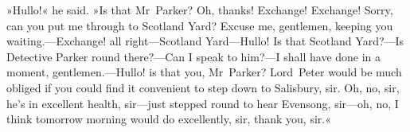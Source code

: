 »Hullo!« he said. »Is that Mr~Parker? Oh, thanks! Exchange! Exchange! Sorry, can you put me through to Scotland Yard? Excuse me, gentlemen, keeping you waiting.---Exchange! all right—Scotland Yard—Hullo! Is that Scotland Yard?---Is Detective Parker round there?---Can I speak to him?---I shall have done in a moment, gentlemen.---Hullo! is that you, Mr~Parker? Lord~Peter would be much obliged if you could find it convenient to step down to Salisbury, sir. Oh, no, sir, he's in excellent health, sir—just stepped round to hear Evensong, sir—oh, no, I think tomorrow morning would do excellently, sir, thank you, sir.«